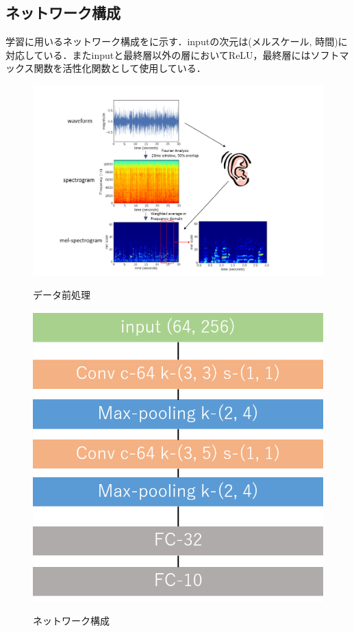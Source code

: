 \subsection{ネットワーク構成}
学習に用いるネットワーク構成をに示す．inputの次元は(メルスケール, 時間)に対応している．またinputと最終層以外の層においてReLU，最終層にはソフトマックス関数を活性化関数として使用している．
\begin{figure}[htbp]
	\begin{center}
		\includegraphics[scale=0.5]{./images/old-study/data-process.png}
		\caption{データ前処理}
		\label{fig:dataprocess}
		\includegraphics[scale=0.47]{./images/old-study/network.png}
		\caption{ネットワーク構成}
		\label{fig:mingwen-network}
	\end{center}
\end{figure}

